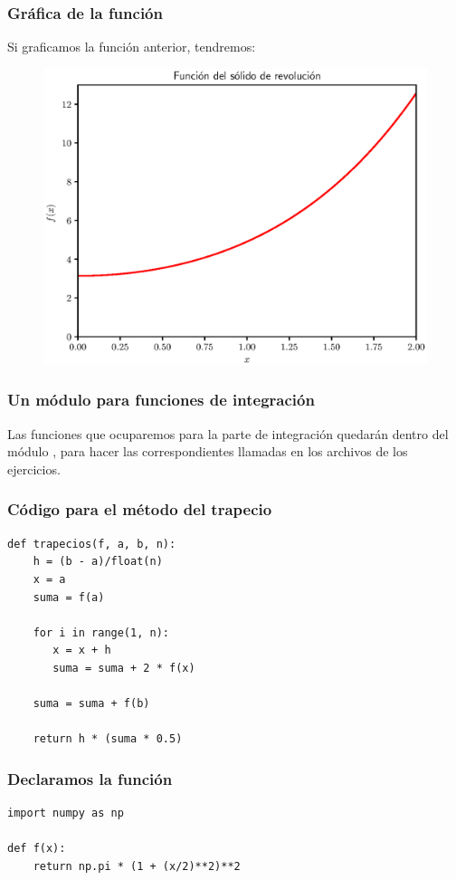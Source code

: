 \documentclass[12pt]{beamer}
\begin{document}
\begin{frame}
\frametitle{Gráfica de la función}
Si graficamos la función anterior, tendremos:
\begin{figure}
    \centering
    \includegraphics[scale=0.5]{Imagenes/integracion_ejercicio_solido_rev_01.eps}
\end{figure}
\end{frame}
\begin{frame}
\frametitle{Un módulo para funciones de integración}
Las funciones que ocuparemos para la parte de integración quedarán dentro del módulo , para hacer las correspondientes llamadas en los archivos de los ejercicios.
\end{frame}
\begin{frame}
\frametitle{Código para el método del trapecio}
\begin{lstlisting}[caption=Código para la función trapecios]
def trapecios(f, a, b, n):
    h = (b - a)/float(n)
    x = a
    suma = f(a)
    
    for i in range(1, n):
       x = x + h
       suma = suma + 2 * f(x)
    
    suma = suma + f(b)
    
    return h * (suma * 0.5)
\end{lstlisting}
\end{frame}
\begin{frame}[fragile]
\frametitle{Declaramos la función}
\begin{lstlisting}[caption=Código para la función f (x)]
import numpy as np

def f(x):
    return np.pi * (1 + (x/2)**2)**2
\end{lstlisting}
    \end{frame}
\end{document}
